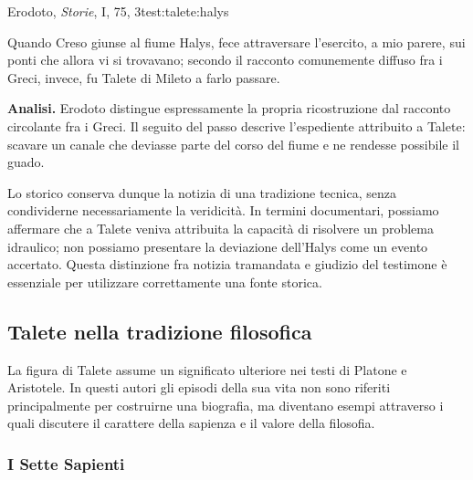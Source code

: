 \begin{testimonianza}{Erodoto, \emph{Storie}, I, 75, 3}{test:talete:halys}
\smallskip
{}\par
Quando Creso giunse al fiume Halys, fece attraversare l'esercito, a mio parere, sui ponti che allora vi si trovavano; secondo il racconto comunemente diffuso fra i Greci, invece, fu Talete di Mileto a farlo passare.
\end{testimonianza}



\noindent\textbf{Analisi.}
Erodoto distingue espressamente la propria ricostruzione dal racconto circolante fra i Greci. Il seguito del passo descrive l'espediente attribuito a Talete: scavare un canale che deviasse parte del corso del fiume e ne rendesse possibile il guado.

Lo storico conserva dunque la notizia di una tradizione tecnica, senza condividerne necessariamente la veridicità. In termini documentari, possiamo affermare che a Talete veniva attribuita la capacità di risolvere un problema idraulico; non possiamo presentare la deviazione dell'Halys come un evento accertato. Questa distinzione fra notizia tramandata e giudizio del testimone è essenziale per utilizzare correttamente una fonte storica.

\subsection{Talete nella tradizione filosofica}

La figura di Talete assume un significato ulteriore nei testi di Platone e Aristotele. In questi autori gli episodi della sua vita non sono riferiti principalmente per costruirne una biografia, ma diventano esempi attraverso i quali discutere il carattere della sapienza e il valore della filosofia.

\subsubsection{I Sette Sapienti}

